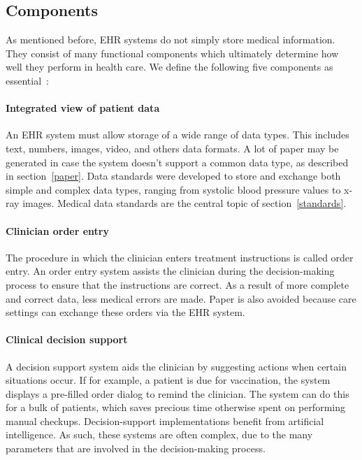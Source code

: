    \subsection{Components}\label{components}

    As mentioned before, EHR systems do not simply store medical information. They consist of many functional components which ultimately determine how well they perform in health care. We define the following five components as essential~\cite{Shortliffe2014}:

    \paragraph{Integrated view of patient data} An EHR system must allow storage of a wide range of data types. This includes text, numbers, images, video, and others data formats. A lot of paper may be generated in case the system doesn't support a common data type, as described in section~\ref{paper}. Data standards were developed to store and exchange both simple and complex data types, ranging from systolic blood pressure values to x-ray images. Medical data standards are the central topic of section~\ref{standards}.

    \paragraph{Clinician order entry} The procedure in which the clinician enters treatment instructions is called order entry. An order entry system assists the clinician during the decision-making process to ensure that the instructions are correct. As a result of more complete and correct data, less medical errors are made. Paper is also avoided because care settings can exchange these orders via the EHR system.

    \paragraph{Clinical decision support} A decision support system aids the clinician by suggesting actions when certain situations occur. If for example, a patient is due for vaccination, the system displays a pre-filled order dialog to remind the clinician. The system can do this for a bulk of patients, which saves precious time otherwise spent on performing manual checkups. Decision-support implementations benefit from artificial intelligence. As such, these systems are often complex, due to the many parameters that are involved in the decision-making process.

